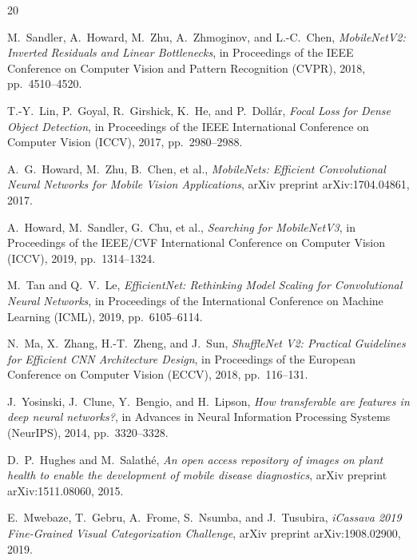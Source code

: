 \documentclass[12pt, a4paper, twoside]{report}
\begin{document}
\begin{thebibliography}{20}

M.~Sandler, A.~Howard, M.~Zhu, A.~Zhmoginov, and L.-C.~Chen,
\textit{MobileNetV2: Inverted Residuals and Linear Bottlenecks},
in Proceedings of the IEEE Conference on Computer Vision and Pattern Recognition (CVPR), 2018, pp.~4510--4520.

T.-Y.~Lin, P.~Goyal, R.~Girshick, K.~He, and P.~Dollár,
\textit{Focal Loss for Dense Object Detection},
in Proceedings of the IEEE International Conference on Computer Vision (ICCV), 2017, pp.~2980--2988.

A.~G.~Howard, M.~Zhu, B.~Chen, et al.,
\textit{MobileNets: Efficient Convolutional Neural Networks for Mobile Vision Applications},
arXiv preprint arXiv:1704.04861, 2017.

A.~Howard, M.~Sandler, G.~Chu, et al.,
\textit{Searching for MobileNetV3},
in Proceedings of the IEEE/CVF International Conference on Computer Vision (ICCV), 2019, pp.~1314--1324.

M.~Tan and Q.~V.~Le,
\textit{EfficientNet: Rethinking Model Scaling for Convolutional Neural Networks},
in Proceedings of the International Conference on Machine Learning (ICML), 2019, pp.~6105--6114.

N.~Ma, X.~Zhang, H.-T.~Zheng, and J.~Sun,
\textit{ShuffleNet V2: Practical Guidelines for Efficient CNN Architecture Design},
in Proceedings of the European Conference on Computer Vision (ECCV), 2018, pp.~116--131.

J.~Yosinski, J.~Clune, Y.~Bengio, and H.~Lipson,
\textit{How transferable are features in deep neural networks?},
in Advances in Neural Information Processing Systems (NeurIPS), 2014, pp.~3320--3328.

D.~P.~Hughes and M.~Salathé,
\textit{An open access repository of images on plant health to enable the development of mobile disease diagnostics},
arXiv preprint arXiv:1511.08060, 2015.

E.~Mwebaze, T.~Gebru, A.~Frome, S.~Nsumba, and J.~Tusubira,
\textit{iCassava 2019 Fine-Grained Visual Categorization Challenge},
arXiv preprint arXiv:1908.02900, 2019.


\end{thebibliography}
\end{document}
